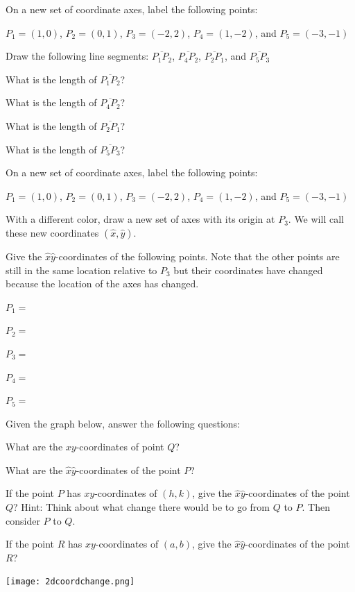 \bq On a new set of coordinate axes, label the following points:

$P_1=(1,0)$, $P_2=(0,1)$, $P_3=(-2,2)$, $P_4=(1,-2)$, and  $P_5=(-3,-1)$
\be
\item Draw the following line segments:
$\overline{P_1 P_2}$, $\overline{P_4 P_2}$, $\overline{P_2 P_1}$, and $\overline{P_5 P_3}$
\item What is the length of $\overline{P_1 P_2}$?
\item What is the length of $\overline{P_4 P_2}$?
\item What is the length of $\overline{P_2 P_1}$?
\item What is the length of $\overline{P_5 P_3}$?
\ee \eq

\bq\label{q3} \be
\item On a new set of coordinate axes, label the following points:

$P_1=(1,0)$, $P_2=(0,1)$, $P_3=(-2,2)$, $P_4=(1,-2)$, and  $P_5=(-3,-1)$

\item With a different color, draw a new set of axes with its origin at $P_3$. We will call these new coordinates $(\hat{x},\hat{y})$.
\item Give the $\hat{x}\hat{y}$-coordinates of the following points. Note that the other points are still in the same location relative to $P_3$ but their coordinates have changed because the location of the axes has changed.
\be
\item $P_1=$
\item $P_2=$
\item $P_3=$
\item $P_4=$
\item $P_5=$
\ee
\ee
\eq

\bq \label{q30}
Given the graph below, answer the following questions:
\be
\item What are the $xy$-coordinates of point $Q$?
\item What are the $\hat{x} \hat{y}$-coordinates of the point $P$?
\item If the point $P$ has $xy$-coordinates of $(h,k)$, give the $\hat{x} \hat{y}$-coordinates of the point $Q$? Hint: Think about what change there would be to go from $Q$ to $P$. Then consider $P$ to $Q$.
\item If the point $R$ has $xy$-coordinates of $(a,b)$, give the $\hat{x} \hat{y}$-coordinates of the point $R$?
\ee

\begin{center} \texttt{[image: 2dcoordchange.png]} \end{center}
\eq

